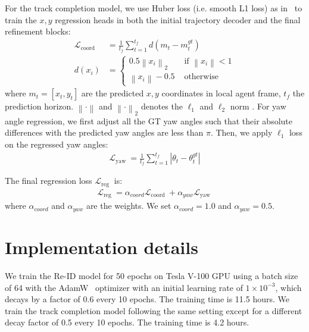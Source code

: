 \documentclass{article} \usepackage{iclr2023_conference,times}
\begin{document}
For the track completion model, we use Huber loss (i.e. smooth L1 loss) as in~\cite{DCMS,laneGCN,gu2021densetnt} to train the $x,y$ regression heads in both the initial trajectory decoder and the final refinement blocks: 
\begin{equation}
\begin{aligned}
\mathcal{L}_{\text {coord }} & =\frac{1}{t_f} \sum_{t=1}^{t_f} d\left(m_t-m_t^{g t}\right) \\
d\left(x_i\right) & = \begin{cases}0.5\left\|x_i\right\|_2 & \text { if }\left\|x_i\right\|<1 \\
\left\|x_i\right\|-0.5 & \text { otherwise }\end{cases}
\end{aligned}
\end{equation}
where $m_t = \left[x_t,y_t\right]$ are the predicted $x,y$ coordinates in local agent frame, $t_f$ the prediction horizon. $\left\| \cdot \right\|$ and $\left\|\cdot \right\|_2$ denotes the $\ell_1$ and $\ell_2$ norm . For yaw angle regression, we first adjust all the GT yaw angles such that their absolute differences with the predicted yaw angles are less than $\pi$. Then, we apply $\ell_1$ loss on the regressed yaw angles:
\begin{equation}
\label{eq: yaw regression loss}
\begin{aligned}
\mathcal{L}_{\text {yaw }}=\frac{1}{t_f} \sum_{t=1}^{t_f}\left|\theta_t-\theta_t^{g t}\right|
\end{aligned}
\end{equation}

The final regression loss $\mathcal{L}_{\text {reg }}$ is:
\begin{equation}
\label{eq: total regression loss}
\begin{aligned}
\mathcal{L}_{\text {reg }}=\alpha_{coord}\mathcal{L}_{\text {coord }} + \alpha_{yaw}\mathcal{L}_{\text {yaw }}
\end{aligned}
\end{equation}
where $\alpha_{coord}$ and $\alpha_{yaw}$ are the weights. We set $\alpha_{coord}=1.0$ and $\alpha_{yaw}=0.5$.

\section{Implementation details}
\label{sec: implementation details}
We train the Re-ID model for 50 epochs on Tesla V-100 GPU using a batch size of 64 with the AdamW~\cite{AdamW} optimizer with an initial learning rate of $1 \times 10^{-3}$, which decays by a factor of 0.6 every 10 epochs. The training time is 11.5 hours. We train the track completion model following the same setting except for a different decay factor of 0.5 every 10 epochs. The training time is 4.2 hours. 
\end{document}
